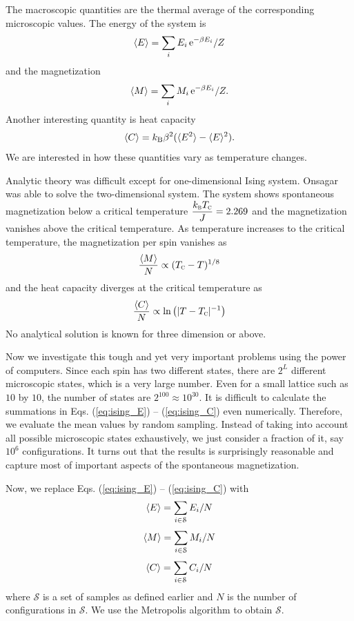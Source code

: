 The macroscopic quantities are the thermal average of the corresponding microscopic values. The energy of the system is
\begin{equation}\label{eq:ising_E}
\langle E \rangle = \sum_i E_i\, \text{e}^{-\beta E_i}/Z
\end{equation}
and the magnetization 
\begin{equation}\label{eq:ising_M}
\langle M \rangle = \sum_i M_i\, \text{e}^{-\beta E_i}/Z.
\end{equation}
Another interesting quantity is heat capacity
\begin{equation}\label{eq:ising_C}
\langle C \rangle = k_\text{B} \beta^2 (\langle E^2 \rangle-\langle E \rangle^2).
\end{equation}
We are interested in how these quantities vary as temperature changes.

Analytic theory was difficult except for one-dimensional Ising system.  Onsagar was able to solve the two-dimensional system.  The system shows spontaneous magnetization below a critical temperature $\displaystyle\frac{k_\textsc{b} T_\textsc{c}}{J}=2.269$ and the magnetization vanishes above the critical temperature. As temperature increases to the critical temperature, the magnetization per spin vanishes as
\begin{equation}
\frac{\langle M \rangle}{N}  \propto (T_\textsc{c}-T)^{1/8}
\end{equation}
and the heat capacity diverges at the critical temperature as
\begin{equation}
\frac{\langle C \rangle}{N}  \propto \ln \left ( |T-T_\textsc{c}|^{-1} \right)
\end{equation}
No analytical solution is known for three dimension or above.

Now we investigate this tough and yet very important problems using the power of computers.
Since each spin has two different states, there are $2^L$ different microscopic states, which is a very large number.  Even for a small lattice such as $10$ by $10$, the number of states are $2^{100} \approx 10^{30}$.  It is difficult to calculate the summations in Eqs. (\ref{eq:ising_E}) -- (\ref{eq:ising_C}) even numerically.  Therefore,
we evaluate the mean values by random sampling.  Instead of taking into account all possible microscopic states exhaustively, we just consider a fraction of it, say $10^6$ configurations.  It turns out that the results is surprisingly reasonable and capture most of important aspects of the spontaneous magnetization. 

Now, we replace Eqs. (\ref{eq:ising_E}) -- (\ref{eq:ising_C}) with
\begin{equation}
\langle E \rangle = \sum_{i \in \mathcal{S}} E_i/N
\end{equation}
\begin{equation}
\langle M \rangle = \sum_{i \in \mathcal{S}} M_i/N
\end{equation}
\begin{equation}
\langle C \rangle = \sum_{i \in \mathcal{S}} C_i/N
\end{equation}
where $\mathcal{S}$ is a set of samples as defined earlier and $N$ is the number of configurations in $\mathcal{S}$.  We use the Metropolis algorithm to obtain $\mathcal{S}$.  

